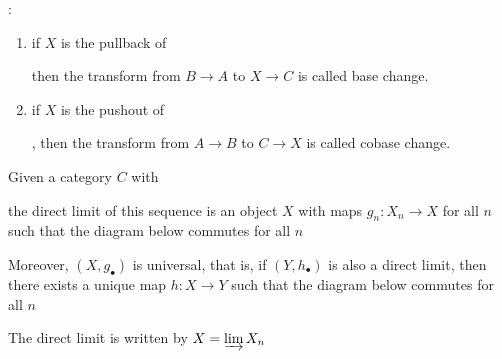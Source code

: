 \documentclass{report}
\begin{document}
\begin{definition}:
    \begin{enumerate}
        \item if $X$ is the pullback of  then the transform from $B \to A$ to $X \to C$ is called base change.
        \item if $X$ is the pushout of , then the transform from $A \to B$ to $C \to X$ is called cobase change.
    \end{enumerate}
\end{definition}


\begin{definition}
    Given a category $C$ with
    \begin{center}
    \end{center}
    the direct limit of this sequence is an object $X$ with maps $g_n: X_n \to X$ for all $n$ such that the diagram below commutes for all $n$
    \begin{center}
    \end{center}
    Moreover, $(X, g_\bullet)$ is universal, that is, if $(Y, h_\bullet)$ is also a direct limit, then there exists a unique map $h: X \to Y$ such that the diagram below commutes for all $n$
    \begin{center}
    \end{center}
    The direct limit is written by $X = \varinjlim X_n$
\end{definition}
\end{document}
